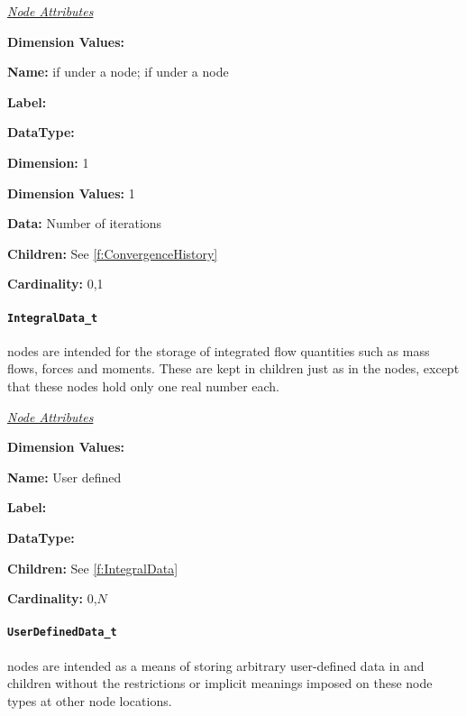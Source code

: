 \textit{\uline{Node Attributes}}
\begin{Ventryic}{\textbf{Dimension Values:}}
\raggedright
\item [\textbf{Name:}]
       if under a  node;
       if under a  node
\item [\textbf{Label:}]
\item [\textbf{DataType:}]
\item [\textbf{Dimension:}]
      1
\item [\textbf{Dimension Values:}]
      1
\item [\textbf{Data:}]
      Number of iterations
\item [\textbf{Children:}]
      See \autoref{f:ConvergenceHistory}
\item [\textbf{Cardinality:}]
      0,1
\end{Ventryic}

\paragraph{\texttt{IntegralData\_t}}

 nodes are intended for the storage of
integrated flow quantities such as mass flows, forces and
moments. These are kept in  children just as in the
 nodes, except that these nodes hold only
one real number each.

\textit{\uline{Node Attributes}}
\begin{Ventryic}{\textbf{Dimension Values:}}
\item [\textbf{Name:}]
      User defined
\item [\textbf{Label:}]
\item [\textbf{DataType:}]
\item [\textbf{Children:}]
      See \autoref{f:IntegralData}
\item [\textbf{Cardinality:}]
      0,$N$
\end{Ventryic}

\paragraph{\texttt{UserDefinedData\_t}}

 nodes are intended as a means of
storing arbitrary user-defined data in  and
 children without the restrictions or implicit
meanings imposed on these node types at other node locations.

